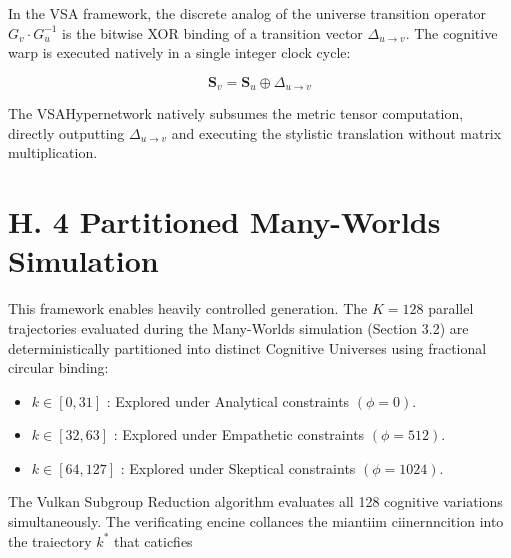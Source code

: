 \documentclass[10pt]{article}
\begin{document}
In the VSA framework, the discrete analog of the universe transition operator $G_{v} \cdot G_{u}^{-1}$ is the bitwise XOR binding of a transition vector $\Delta_{u \rightarrow v}$. The cognitive warp is executed natively in a single integer clock cycle:

$$
\mathbf{S}_{v}=\mathbf{S}_{u} \oplus \Delta_{u \rightarrow v}
$$

The VSAHypernetwork natively subsumes the metric tensor computation, directly outputting $\Delta_{u \rightarrow v}$ and executing the stylistic translation without matrix multiplication.

\section*{H. 4 Partitioned Many-Worlds Simulation}
This framework enables heavily controlled generation. The $K=128$ parallel trajectories evaluated during the Many-Worlds simulation (Section 3.2) are deterministically partitioned into distinct Cognitive Universes using fractional circular binding:

\begin{itemize}
  \item $k \in[0,31]$ : Explored under Analytical constraints $(\phi=0)$.
  \item $k \in[32,63]$ : Explored under Empathetic constraints $(\phi=512)$.
  \item $k \in[64,127]$ : Explored under Skeptical constraints $(\phi=1024)$.
\end{itemize}

The Vulkan Subgroup Reduction algorithm evaluates all 128 cognitive variations simultaneously. The verificating encine collances the miantiim ciinernncition into the traiectory $k^{*}$ that caticfies
\end{document}
